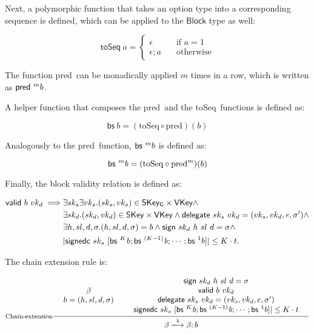 \documentclass[11pt,a4paper]{article}
\newcommand{\var}[1]{\mathit{#1}}
\newcommand{\fun}[1]{\mathsf{#1}}
\newcommand{\type}[1]{\mathsf{#1}}
\newcommand{\trans}[2]{\xlongrightarrow[\textsc{#1}]{#2}}
\newcommand{\Block}{\type{Block}}
\newcommand{\SKey}{\type{SKey}}
\newcommand{\SKeyGen}{\type{SKey_G}}
\newcommand{\VKey}{\type{VKey}}
\newcommand{\signname}{sign}
\newcommand{\signedseqname}{signedc}
\newcommand{\delegatename}{delegate}
\newcommand{\validname}{valid}
\newcommand{\predbname}{pred} %
\newcommand{\toseqname}{toSeq} %
\newcommand{\predbseqname}{bs} %
\newcommand{\sign}[4]{\fun{\signname}\ #1 ~ #2 ~ #3 ~ #4}
\newcommand{\signedwindow}[2]{\fun{\signedseqname}\ #1 ~ #2}
\newcommand{\delegate}[2]{\fun{\delegatename}\ #1 ~ #2}
\newcommand{\valid}[2]{\fun{\validname} ~ #1 ~ #2}
\newcommand{\predb}[1]{\fun{\predbname} ~ #1}
\newcommand{\toseq}[1]{\fun{\toseqname} ~ #1}
\newcommand{\predbseq}[1]{\fun{\predbseqname} ~ #1}
\begin{document}
Next, a polymorphic function that takes an option type into a corresponding
sequence is defined, which can be applied to the $\Block$ type as well:

\begin{equation}
  \label{eq:toseq}
  \toseq{a} =
  \begin{cases}
    \epsilon & \quad \text{if } a = 1 \\
    \epsilon; a & \quad \text{otherwise}
  \end{cases}
\end{equation}

The function \predbname\ can be monadically applied $m$ times in a row, which
is written as $\predb^m{b}$.

A helper function that composes the \predbname\ and the \toseqname\
functions is defined as:

\begin{equation}
  \label{eq:predbseq}
  \predbseq{b} = (\text{\toseqname} \circ \text{\predbname})(b)
\end{equation}

Analogously to the \predbname\ function, $\predbseq^m{b}$ is defined as:

\begin{equation}
  \label{eq:predbseqton}
  \predbseq^m{b} = (\text{\toseqname} \circ \text{\predbname}^m)(b)
\end{equation}

Finally, the block validity relation is defined as:

\begin{align}
  \label{eq:valid-block}
    \valid{b}{vk_d} \implies &
      \exists sk_s \exists vk_s. (sk_s, vk_s) \in \SKeyGen \times \VKey \wedge \\
      & \exists sk_d. (sk_d, vk_d) \in \SKey \times \VKey \wedge
      \delegate{sk_s}{vk_d} = (vk_s, vk_d, e, \sigma') \wedge \\
      & \exists h, sl, d, \sigma. (h, sl, d, \sigma) = b \wedge
        \sign{sk_d}{h}{sl}{d} = \sigma \wedge \\
      & | \signedwindow{sk_s}{[\predbseq^K\var{b}; \predbseq^{(K-1)}\var{b}; \cdots; \predbseq^1{b}]} | \leq K \cdot t.
\end{align}

The chain extension rule is:

\begin{equation}
  \label{eq:chain-extension}
  \inference[Chain-extension]
  {
    {\begin{array}{c}
       \beta \\
       b = (h, sl, d, \sigma)
    \end{array}}
    &
    {\begin{array}{c}
       \sign{sk_d}{h}{sl}{d} = \sigma \\
       \valid{b}{vk_d} \\
       \delegate{sk_s}{vk_d} = (vk_s, vk_d, e, \sigma') \\
       \signedwindow{sk_s}{[\predbseq^K\var{b}; \predbseq^{(K-1)}\var{b}; \cdots; \predbseq^1{b}]} | \leq K \cdot t
    \end{array}}
  }
  {\beta \trans{}{\var{b}} {\beta; b}}
\end{equation}
\end{document}
